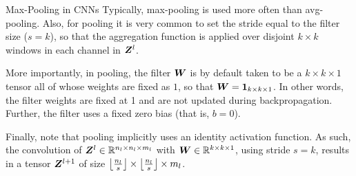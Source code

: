 %
\begin{frame}{Max-Pooling in CNNs}
Typically, max-pooling is used more often than avg-pooling. Also, 
for pooling it is very common to set the stride equal to the filter size
($s=k$), so that the aggregation
function is applied over disjoint $k \times k$ windows in each channel in
${\boldsymbol Z}^l$.

\medskip


More importantly, in pooling, the filter ${\boldsymbol W}$ is by default taken to be a 
$k \times k \times 1$ tensor all of whose weights are fixed as $1$, so
that ${\boldsymbol W} = \mathbf{1}_{k \times k \times 1}$. In other words, the filter
weights are fixed at 1 and are not updated during backpropagation.
Further, the filter uses a fixed zero bias 
(that is, $b = 0$).


\medskip

Finally, note that pooling implicitly uses an identity activation function.
As such, the convolution of ${\boldsymbol Z}^l \in {\mathord{\mathbb R}}^{n_l \times n_l
\times m_l}$ with ${\boldsymbol W} \in
{\mathord{\mathbb R}}^{k \times k \times 1}$, using stride
$s=k$, results in a tensor ${\boldsymbol Z}^{l+1}$ 
of size $\left\lfloor\frac{n_l}{s}\right\rfloor
\times \left\lfloor\frac{n_l}{s}\right\rfloor \times m_l$.
\end{frame}
%
%
